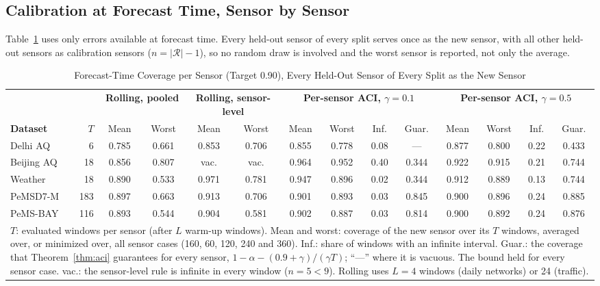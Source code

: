 \subsection{Calibration at Forecast Time, Sensor by Sensor}
\label{sec:deployable}

Table~\ref{tab:deployable} uses only errors available at forecast time. Every held-out sensor of every split
serves once as the new sensor, with all other held-out sensors as calibration sensors ($n=|\mathcal{R}|-1$), so
no random draw is involved and the worst sensor is reported, not only the average.

\begin{table}[!t]
\caption{Forecast-Time Coverage per Sensor (Target 0.90), Every Held-Out Sensor of Every Split as the New Sensor}
\label{tab:deployable}
\centering
\footnotesize
\setlength{\tabcolsep}{4.2pt}
\begin{tabular}{lrcccccccccccc}
\toprule
 & & \multicolumn{2}{c}{\textbf{Rolling, pooled}} & \multicolumn{2}{c}{\textbf{Rolling, sensor-level}} &
 \multicolumn{4}{c}{\textbf{Per-sensor ACI, $\gamma=0.1$}} & \multicolumn{4}{c}{\textbf{Per-sensor ACI, $\gamma=0.5$}} \\
\textbf{Dataset} & $T$ & Mean & Worst & Mean & Worst & Mean & Worst & Inf. & Guar. & Mean & Worst & Inf. & Guar. \\
\midrule
Delhi AQ   &   6 & 0.785 & 0.661 & 0.853 & 0.706 & 0.855 & 0.778 & 0.08 & ---   & 0.877 & 0.800 & 0.22 & 0.433 \\
Beijing AQ &  18 & 0.856 & 0.807 & vac.  & vac.  & 0.964 & 0.952 & 0.40 & 0.344 & 0.922 & 0.915 & 0.21 & 0.744 \\
Weather    &  18 & 0.890 & 0.533 & 0.971 & 0.781 & 0.947 & 0.896 & 0.02 & 0.344 & 0.912 & 0.889 & 0.13 & 0.744 \\
PeMSD7-M   & 183 & 0.897 & 0.663 & 0.913 & 0.706 & 0.901 & 0.893 & 0.03 & 0.845 & 0.900 & 0.896 & 0.24 & 0.885 \\
PeMS-BAY   & 116 & 0.893 & 0.544 & 0.904 & 0.581 & 0.902 & 0.887 & 0.03 & 0.814 & 0.900 & 0.892 & 0.24 & 0.876 \\
\bottomrule
\multicolumn{14}{p{0.95\textwidth}}{\footnotesize $T$: evaluated windows per sensor (after $L$ warm-up windows).
Mean and worst: coverage of the new sensor over its $T$ windows, averaged over, or minimized over, all
sensor cases (160, 60, 120, 240 and 360). Inf.: share of windows with an infinite interval. Guar.: the coverage
that Theorem~\ref{thm:aci} guarantees for every sensor, $1-\alpha-(0.9+\gamma)/(\gamma T)$; ``---'' where it is
vacuous. The bound held for every sensor case. vac.: the sensor-level rule is infinite in every window ($n=5<9$).
Rolling uses $L=4$ windows (daily networks) or 24 (traffic).} \\
\end{tabular}
\end{table}

